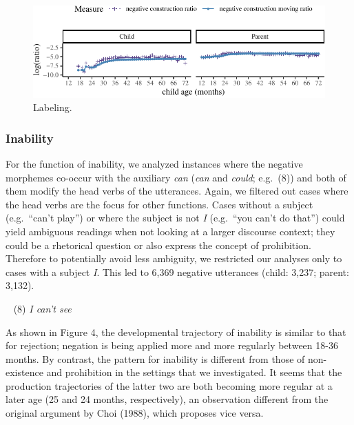 \documentclass[10pt, letterpaper]{article}
\newenvironment{CodeChunk}{}{}
\begin{document}
\begin{figure}[h!]

\begin{CodeChunk}


\begin{center}\includegraphics{figs/learning-1} \end{center}

\end{CodeChunk}
\caption[This image spans both columns]{Labeling.}\label{fig:labeling}
\end{figure}

\hypertarget{inability}{%
\subsubsection{Inability}\label{inability}}

For the function of inability, we analyzed instances where the negative
morphemes co-occur with the auxiliary \emph{can} (\emph{can} and
\emph{could}; e.g.~(8)) and both of them modify the head verbs of the
utterances. Again, we filtered out cases where the head verbs are the
focus for other functions. Cases without a subject (e.g.~``can't play'')
or where the subject is not \emph{I} (e.g.~``you can't do that'') could
yield ambiguous readings when not looking at a larger discourse context;
they could be a rhetorical question or also express the concept of
prohibition. Therefore to potentially avoid less ambiguity, we
restricted our analyses only to cases with a subject \emph{I}. This led
to 6,369 negative utterances (child: 3,237; parent: 3,132).

~ (8) \emph{I can't see}

As shown in Figure 4, the developmental trajectory of inability is
similar to that for rejection; negation is being applied more and more
regularly between 18-36 months. By contrast, the pattern for inability
is different from those of non-existence and prohibition in the settings
that we investigated. It seems that the production trajectories of the
latter two are both becoming more regular at a later age (25 and 24
months, respectively), an observation different from the original
argument by Choi (1988), which proposes vice versa.
\end{document}
